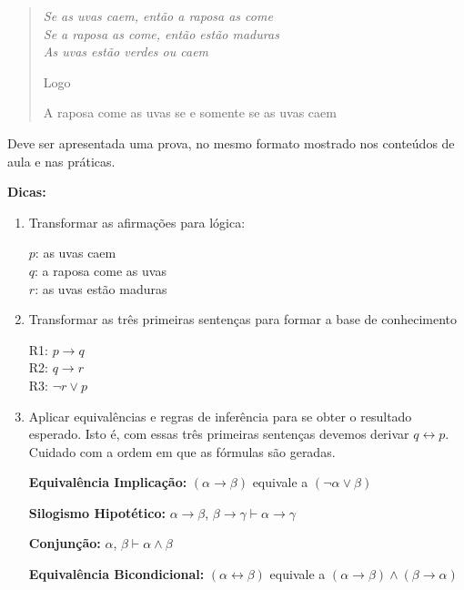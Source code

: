     \begin{adjustwidth}{3em}{}
        \begin{quote}
            \itshape
            Se as uvas caem, então a raposa as come \\
            Se a raposa as come, então estão maduras \\
            As uvas estão verdes ou caem

            Logo

            A raposa come as uvas se e somente se as uvas caem
        \end{quote}
    \end{adjustwidth}

    Deve ser apresentada uma prova, no mesmo formato mostrado nos conteúdos de aula e nas práticas.

    \begin{adjustwidth}{1em}{}
    \textbf{Dicas:}
    \end{adjustwidth}
    \begin{enumerate}[label=\arabic*.]
        \item Transformar as afirmações para lógica:

        $p$: as uvas caem \\
        $q$: a raposa come as uvas \\
        $r$: as uvas estão maduras

        \item Transformar as três primeiras sentenças para formar a base de conhecimento

        R1: $p \rightarrow q$ \\
        R2: $q \rightarrow r$ \\
        R3: $\neg r \vee p$

        \item Aplicar equivalências e regras de inferência para se obter o resultado esperado. Isto é, com essas três primeiras sentenças devemos derivar $q \leftrightarrow p$. Cuidado com a ordem em que as fórmulas são geradas.

        \textbf{Equivalência Implicação:} $(\alpha \rightarrow \beta)$ equivale a $(\neg \alpha \vee \beta)$

        \textbf{Silogismo Hipotético:} $\alpha \rightarrow \beta$, $\beta \rightarrow \gamma \vdash \alpha \rightarrow \gamma$

        \textbf{Conjunção:} $\alpha$, $\beta \vdash \alpha \wedge \beta$

        \textbf{Equivalência Bicondicional:} $(\alpha \leftrightarrow \beta)$ equivale a $(\alpha \rightarrow \beta) \wedge (\beta \rightarrow \alpha)$
    \end{enumerate}


